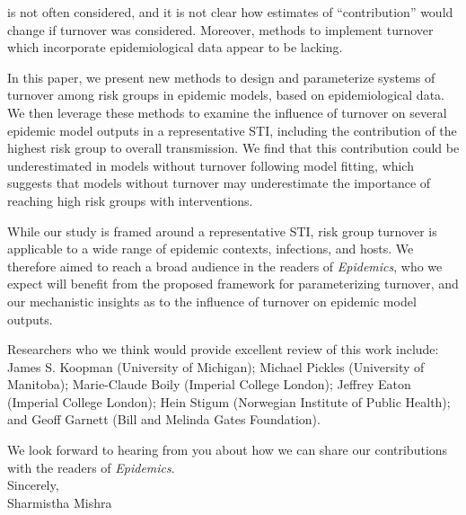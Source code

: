 \documentclass[a4]{article}
\begin{document}
is not often considered, and it is not clear how
estimates of ``contribution'' would change if turnover was considered.
Moreover, methods to implement turnover which incorporate epidemiological data
appear to be lacking.
\par
In this paper, we present new methods to design and parameterize
systems of turnover among risk groups in epidemic models,
based on epidemiological data.
We then leverage these methods to examine the influence of turnover
on several epidemic model outputs in a representative STI,
including the contribution of the highest risk group to overall transmission.
We find that this contribution could be underestimated in models without turnover
following model fitting,
which suggests that models without turnover may underestimate
the importance of reaching high risk groups with interventions.
\par
While our study is framed around a representative STI,
risk group turnover is applicable to a wide range of 
epidemic contexts, infections, and hosts.
We therefore aimed to reach a broad audience in the readers of \textit{Epidemics},
who we expect will benefit from the proposed framework for parameterizing turnover,
and our mechanistic insights as to the influence of turnover on epidemic model outputs.
\par
Researchers who we think would provide excellent review of this work include:
James S. Koopman (University of Michigan);
Michael Pickles (University of Manitoba);
Marie-Claude Boily (Imperial College London);
Jeffrey Eaton (Imperial College London);
Hein Stigum (Norwegian Institute of Public Health); and
Geoff Garnett (Bill and Melinda Gates Foundation).
\par
We look forward to hearing from you about how we can share our contributions
with the readers of \textit{Epidemics}.
\\[2em]
Sincerely,\\[1em]
Sharmistha Mishra
\end{document}
